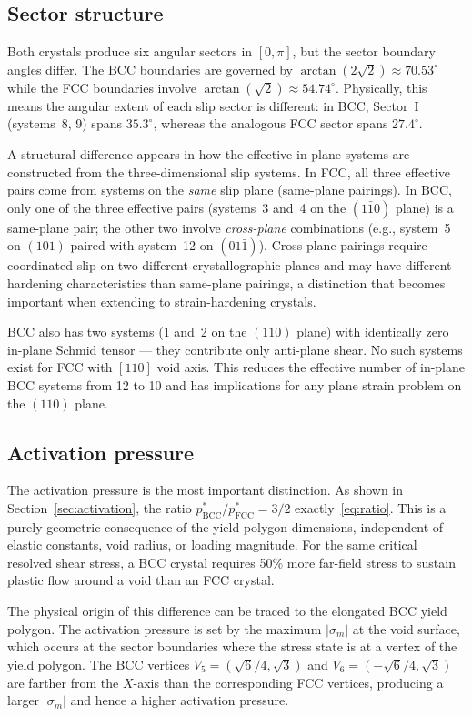 \documentclass{svjour3} %
\newcommand{\sm}{\sigma_m}
\begin{document}
\subsection{Sector structure}

Both crystals produce six angular sectors in $[0, \pi]$, but the
sector boundary angles differ. The BCC boundaries are governed by
$\arctan(2\sqrt{2}) \approx 70.53^\circ$ while the FCC boundaries
involve $\arctan(\sqrt{2}) \approx 54.74^\circ$. Physically, this
means the angular extent of each slip sector is different: in BCC,
Sector~I (systems~8, 9) spans $35.3^\circ$, whereas the analogous
FCC sector spans $27.4^\circ$.

A structural difference appears in how the effective in-plane systems
are constructed from the three-dimensional slip systems. In FCC, all
three effective pairs come from systems on the \emph{same} slip plane
(same-plane pairings). In BCC, only one of the three effective pairs
(systems~3 and~4 on the $(1\bar{1}0)$ plane) is a same-plane pair; the
other two involve \emph{cross-plane} combinations (e.g., system~5 on
$(101)$ paired with system~12 on $(01\bar{1})$). Cross-plane pairings
require coordinated slip on two different crystallographic planes and
may have different hardening characteristics than same-plane pairings,
a distinction that becomes important when extending to strain-hardening
crystals.

BCC also has two systems (1 and~2 on the $(110)$ plane) with
identically zero in-plane Schmid tensor --- they contribute only
anti-plane shear. No such systems exist for FCC with $[110]$ void axis.
This reduces the effective number of in-plane BCC systems from 12 to 10
and has implications for any plane strain problem on the $(110)$ plane.

\subsection{Activation pressure}

The activation pressure is the most important distinction. As
shown in Section~\ref{sec:activation}, the ratio
$p^*_{\mathrm{BCC}}/p^*_{\mathrm{FCC}} = 3/2$ exactly~\eqref{eq:ratio}.
This is a purely geometric consequence of the yield polygon dimensions,
independent of elastic constants, void radius, or loading magnitude.
For the same critical resolved shear stress, a BCC crystal requires
50\% more far-field stress to sustain plastic flow around a void than
an FCC crystal.

The physical origin of this difference can be traced to the elongated
BCC yield polygon. The activation pressure is set by the maximum
$|\sm|$ at the void surface, which occurs at the sector boundaries
where the stress state is at a vertex of the yield polygon. The BCC
vertices $V_5 = (\sqrt{6}/4, \sqrt{3})$ and
$V_6 = (-\sqrt{6}/4, \sqrt{3})$ are farther from the $X$-axis than the
corresponding FCC vertices, producing a larger $|\sm|$ and hence a
higher activation pressure.
\end{document}
